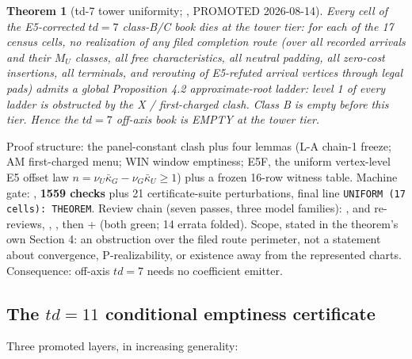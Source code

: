 \documentclass[11pt]{article}
\newtheorem{theorem}{Theorem}[section]
\theoremstyle{definition}
\theoremstyle{remark}
\begin{document}
\begin{theorem}[td-7 tower uniformity; , PROMOTED 2026-08-14]
Every cell of the E5-corrected $td=7$ class-B/C book dies at the tower
tier: for each of the 17 census cells, no realization of any filed
completion route (over all recorded arrivals and their $M_U$ classes, all
free characteristics, all neutral padding, all zero-cost insertions, all
terminals, and rerouting of E5-refuted arrival vertices through legal pads)
admits a global Proposition 4.2 approximate-root ladder: level 1 of every
ladder is obstructed by the X / first-charged clash. Class B is empty
before this tier. Hence the $td=7$ off-axis book is EMPTY at the tower
tier.
\end{theorem}

Proof structure: the panel-constant clash plus four lemmas (L-A chain-1
freeze; AM first-charged menu; WIN window emptiness; E5F, the uniform
vertex-level E5 offset law $n=\nu_U\bar\kappa_G-\nu_G\bar\kappa_U\ge 1$)
plus a frozen 16-row witness table. Machine gate: ,
\textbf{1559 checks} plus 21 certificate-suite perturbations, final line
\texttt{UNIFORM (17 cells): THEOREM}. Review chain (seven passes, three
model families): ,
 and re-reviews,
, , then
 + 
(both green; 14 errata folded). Scope, stated in the theorem's own Section
4: an obstruction over the filed route perimeter, not a statement about
convergence, P-realizability, or existence away from the represented
charts. Consequence: off-axis $td=7$ needs no coefficient emitter.

\subsection{The $td=11$ conditional emptiness certificate}

Three promoted layers, in increasing generality:
\end{document}
